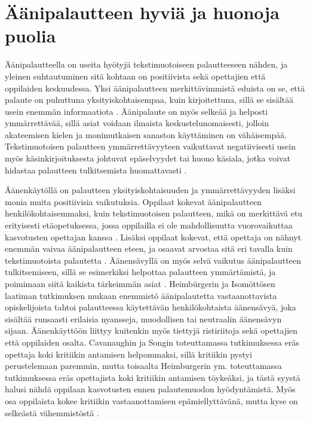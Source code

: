 \documentclass[utf8]{gradu3}
\begin{document}
\section{Äänipalautteen hyviä ja huonoja puolia}

Äänipalautteella on useita hyötyjä tekstimuotoiseen palautteeseen nähden, ja yleinen suhtautuminen sitä kohtaan on positiivista sekä opettajien että oppilaiden keskuudessa. Yksi äänipalautteen merkittävimmistä eduista on se, että palaute on puhuttuna yksityiskohtaisempaa, kuin kirjoitettuna, sillä se sisältää usein enemmän informaatiota \parencite[][]{attitudes}. Äänipalaute on myös selkeää ja helposti ymmärrettävää, sillä asiat voidaan ilmaista keskustelunomaisesti, jolloin akateemisen kielen ja monimutkaisen sanaston käyttäminen on vähäisempää. Tekstimuotoisen palautteen ymmärrettävyyteen vaikuttavat negatiivisesti usein myös käsinkirjoituksesta johtuvat epäselvyydet tai huono käsiala, jotka voivat hidastaa palautteen tulkitsemista huomattavasti \parencite[][]{developing}.

Äänenkäytöllä on palautteen yksityiskohtaisuuden ja ymmärrettävyyden lisäksi monia muita positiivisia vaikutuksia. Oppilaat kokevat äänipalautteen henkilökohtaisemmaksi, kuin tekstimuotoisen palautteen, mikä on merkittävä etu erityisesti etäopetuksessa, jossa oppilailla ei ole mahdollisuutta vuorovaikuttaa kasvotusten opettajan kanssa \parencite[][]{using, distanceLearning}. Lisäksi oppilaat kokevat, että opettaja on nähnyt enemmän vaivaa äänipalautteen eteen, ja osaavat arvostaa sitä eri tavalla kuin tekstimuotoista palautetta \parencite[][]{listenOrToRead}. Äänensävyllä on myös selvä vaikutus äänipalautteen tulkitsemiseen, sillä se esimerkiksi helpottaa palautteen ymmärtämistä, ja poimimaan siitä kaikista tärkeimmän asiat \parencite[][]{attitudes}. Heimbürgerin ja Isomöttösen \parencite*[][]{moderating} laatiman tutkimuksen mukaan enemmistö äänipalautetta vastaanottavista opiskelijoista tahtoi palautteessa käytettävän henkilökohtaista äänensävyä, joka sisältää runsaasti erilaisia nyansseja, muodollisen tai neutraalin äänensävyn sijaan. Äänenkäyttöön liittyy kuitenkin myös tiettyjä ristiriitoja sekä opettajien että oppilaiden osalta. Cavanaughin ja Songin \parencite[][]{versus} toteuttamassa tutkimuksessa eräs opettaja koki kritiikin antamisen helpommaksi, sillä kritiikin pystyi perustelemaan paremmin, mutta toisaalta Heimburgerin ym. \parencite*[][]{academics} toteuttamassa tutkimuksessa eräs opettajista koki kritiikin antamisen töykeäksi, ja tästä syystä halusi nähdä oppilaan kasvotusten ennen palautemuodon hyödyntämistä. Myös osa oppilaista kokee kritiikin vastaanottamisen epämiellyttävänä, mutta kyse on selkeästä vähemmistöstä \parencite[][]{voice}. 
\end{document}
